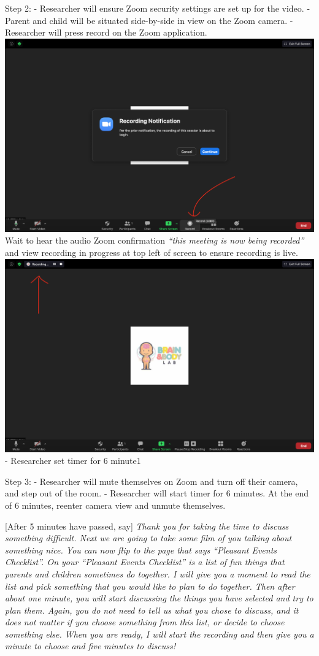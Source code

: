 \documentclass[]{book}
\begin{document}
Step 2:
- Researcher will ensure Zoom security settings are set up for the video.
- Parent and child will be situated side-by-side in view on the Zoom camera.
-Researcher will press record on the Zoom application. \includegraphics{images/zoom_parent_child_interaction/3.png} Wait to hear the audio Zoom confirmation \emph{``this meeting is now being recorded''} and view recording in progress at top left of screen to ensure recording is live. \includegraphics{images/zoom_parent_child_interaction/4.png}
- Researcher set timer for 6 minute1

Step 3:
- Researcher will mute themselves on Zoom and turn off their camera, and step out of the room.
- Researcher will start timer for 6 minutes. At the end of 6 minutes, reenter camera view and unmute themselves.

{[}After 5 minutes have passed, say{]} \emph{Thank you for taking the time to discuss something difficult. Next we are going to take some film of you talking about something nice. You can now flip to the page that says ``Pleasant Events Checklist''. On your ``Pleasant Events Checklist'' is a list of fun things that parents and children sometimes do together. I will give you a moment to read the list and pick something that you would like to plan to do together. Then after about one minute, you will start discussing the things you have selected and try to plan them. Again, you do not need to tell us what you chose to discuss, and it does not matter if you choose something from this list, or decide to choose something else. When you are ready, I will start the recording and then give you a minute to choose and five minutes to discuss!}
\end{document}
